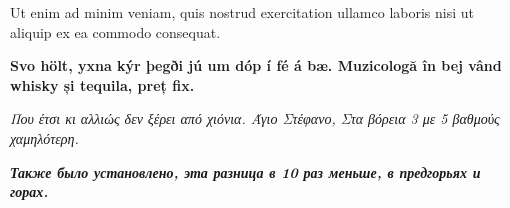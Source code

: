 \documentclass{article}
\begin{document}
\sffamily
Ut enim ad minim veniam, quis nostrud exercitation ullamco
laboris nisi ut aliquip ex ea commodo consequat.

\textbf{Svo hölt, yxna kýr þegði jú um dóp í fé á bæ.
  Muzicologă în bej vând whisky și tequila, preț fix.}

\textit{Που έτσι κι αλλιώς δεν ξέρει από χιόνια.
  Άγιο Στέφανο, Στα βόρεια 3 με 5 βαθμούς χαμηλότερη.}

\textbf{\textit{Также было установлено, эта разница в
  10 раз меньше, в предгорьях и горах.}}
\end{document}
